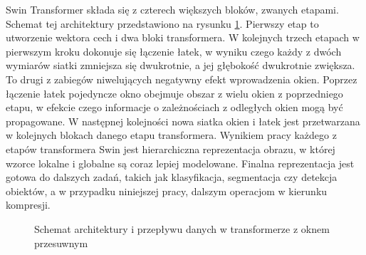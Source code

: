 Swin Transformer składa się z czterech większych bloków, zwanych etapami. Schemat tej architektury przedstawiono na rysunku \ref{fig:diagram-swin}. Pierwszy etap to utworzenie wektora cech i dwa bloki transformera. W kolejnych trzech etapach w pierwszym kroku dokonuje się łączenie łatek, w wyniku czego każdy z dwóch wymiarów siatki zmniejsza się dwukrotnie, a jej głębokość dwukrotnie zwiększa. To drugi z zabiegów niwelujących negatywny efekt wprowadzenia okien. Poprzez łączenie łatek pojedyncze okno obejmuje obszar z wielu okien z poprzedniego etapu, w efekcie czego informacje o zależnościach z odległych okien mogą być propagowane. W następnej kolejności nowa siatka okien i łatek jest przetwarzana w kolejnych blokach danego etapu transformera. Wynikiem pracy każdego z etapów transformera Swin jest hierarchiczna reprezentacja obrazu, w której wzorce lokalne i globalne są coraz lepiej modelowane. Finalna reprezentacja jest gotowa do dalszych zadań, takich jak klasyfikacja, segmentacja czy detekcja obiektów, a w przypadku niniejszej pracy, dalszym operacjom w kierunku kompresji.

\begin{figure}[H]
	\centering
	
	\caption[Schemat architektury i przepływu danych w transformerze z oknem przesuwnym.]{Schemat architektury i przepływu danych w transformerze z oknem przesuwnym\cite{liu2021swintransformerhierarchicalvision}}
	\label{fig:diagram-swin}
\end{figure}


